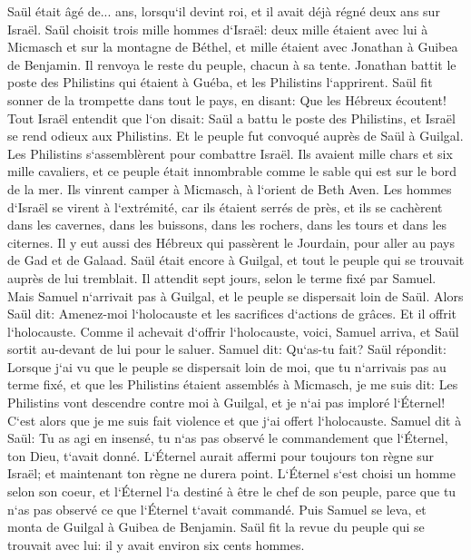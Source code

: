 \verse Saül était âgé de... ans, lorsqu`il devint roi, et il avait déjà régné deux ans sur Israël. 
\verse Saül choisit trois mille hommes d`Israël: deux mille étaient avec lui à Micmasch et sur la montagne de Béthel, et mille étaient avec Jonathan à Guibea de Benjamin. Il renvoya le reste du peuple, chacun à sa tente. 
\verse Jonathan battit le poste des Philistins qui étaient à Guéba, et les Philistins l`apprirent. Saül fit sonner de la trompette dans tout le pays, en disant: Que les Hébreux écoutent! 
\verse Tout Israël entendit que l`on disait: Saül a battu le poste des Philistins, et Israël se rend odieux aux Philistins. Et le peuple fut convoqué auprès de Saül à Guilgal. 
\verse Les Philistins s`assemblèrent pour combattre Israël. Ils avaient mille chars et six mille cavaliers, et ce peuple était innombrable comme le sable qui est sur le bord de la mer. Ils vinrent camper à Micmasch, à l`orient de Beth Aven. 
\verse Les hommes d`Israël se virent à l`extrémité, car ils étaient serrés de près, et ils se cachèrent dans les cavernes, dans les buissons, dans les rochers, dans les tours et dans les citernes. 
\verse Il y eut aussi des Hébreux qui passèrent le Jourdain, pour aller au pays de Gad et de Galaad. Saül était encore à Guilgal, et tout le peuple qui se trouvait auprès de lui tremblait. 
\verse Il attendit sept jours, selon le terme fixé par Samuel. Mais Samuel n`arrivait pas à Guilgal, et le peuple se dispersait loin de Saül. 
\verse Alors Saül dit: Amenez-moi l`holocauste et les sacrifices d`actions de grâces. Et il offrit l`holocauste. 
\verse Comme il achevait d`offrir l`holocauste, voici, Samuel arriva, et Saül sortit au-devant de lui pour le saluer. 
\verse Samuel dit: Qu`as-tu fait? Saül répondit: Lorsque j`ai vu que le peuple se dispersait loin de moi, que tu n`arrivais pas au terme fixé, et que les Philistins étaient assemblés à Micmasch, 
\verse je me suis dit: Les Philistins vont descendre contre moi à Guilgal, et je n`ai pas imploré l`Éternel! C`est alors que je me suis fait violence et que j`ai offert l`holocauste. 
\verse Samuel dit à Saül: Tu as agi en insensé, tu n`as pas observé le commandement que l`Éternel, ton Dieu, t`avait donné. L`Éternel aurait affermi pour toujours ton règne sur Israël; 
\verse et maintenant ton règne ne durera point. L`Éternel s`est choisi un homme selon son coeur, et l`Éternel l`a destiné à être le chef de son peuple, parce que tu n`as pas observé ce que l`Éternel t`avait commandé. 
\verse Puis Samuel se leva, et monta de Guilgal à Guibea de Benjamin. Saül fit la revue du peuple qui se trouvait avec lui: il y avait environ six cents hommes. 
